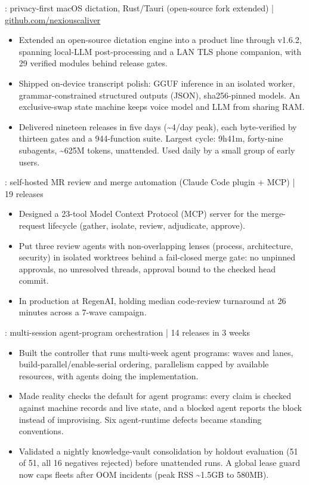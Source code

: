 \documentclass[10pt,a4paper]{article}
\newcommand{\tld}{\textasciitilde{}}%
\begin{document}
: privacy-first macOS dictation, Rust/Tauri (open-source fork extended) |
\href{https://github.com/nexiouscaliver}{github.com/nexiouscaliver}
\begin{itemize}
  \item Extended an open-source dictation engine into a product line through v1.6.2,
  spanning local-LLM post-processing and a LAN TLS phone companion, with 29 verified modules
  behind release gates.
  \item Shipped on-device transcript polish: GGUF inference in an isolated worker,
  grammar-constrained structured outputs (JSON), \mbox{sha256-pinned} models. An exclusive-swap
  state machine keeps voice model and LLM from sharing RAM.
  \item Delivered nineteen releases in five days (\tld{}4/day peak), each byte-verified by
  thirteen gates and a 944-function suite. Largest cycle: 9h41m, forty-nine subagents,
  \tld{}625M tokens, unattended. Used daily by a small group of early users.
\end{itemize}

\bigskip
{}: self-hosted MR review and merge automation (Claude Code plugin + MCP) |
19 releases
\begin{itemize}
  \item Designed a 23-tool Model Context Protocol (MCP) server for the merge-request
  lifecycle (gather, isolate, review, adjudicate, approve).
  \item Put three review agents with non-overlapping lenses (process, architecture, security) in
  isolated worktrees behind a fail-closed merge gate: no unpinned approvals, no unresolved
  threads, approval bound to the checked head commit.
  \item In production at RegenAI, holding median code-review turnaround at 26 minutes across a
  7-wave campaign.
\end{itemize}

\bigskip
{}: multi-session agent-program orchestration | 14 releases in 3 weeks
\begin{itemize}
  \item Built the controller that runs multi-week agent programs: waves and lanes,
  build-parallel/enable-serial ordering, parallelism capped by available resources, with agents doing the implementation.
  \item Made reality checks the default for agent programs: every claim is checked against machine
  records and live state, and a blocked agent reports the block instead of improvising. Six
  agent-runtime defects became standing conventions.
  \item Validated a nightly knowledge-vault consolidation by holdout evaluation (51 of 51,
  all 16 negatives rejected) before unattended runs. A global lease guard now caps fleets after
  OOM incidents (peak RSS \tld{}1.5GB to 580MB).
\end{itemize}
\end{document}
